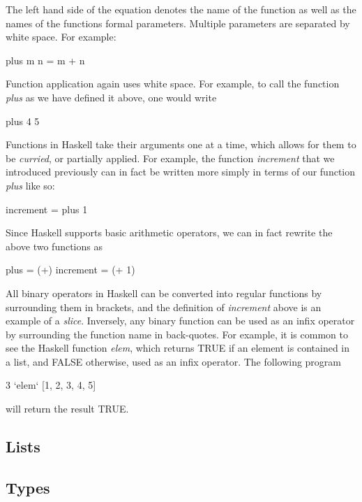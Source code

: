 \documentclass[thesis.tex]{subfiles}
\begin{document}
The left hand side of the equation denotes the name of the function as well as the names of the
functions formal parameters. Multiple parameters are separated by white space. For example:

\begin{spec}
plus m n = m + n
\end{spec}

Function application again uses white space. For example, to call the function \emph{plus} as we have
defined it above, one would write

\begin{spec}
plus 4 5
\end{spec}

Functions in Haskell take their arguments one at a time, which allows for them to be \emph{curried}, or
partially applied. For example, the function \emph{increment} that we introduced previously can in fact
be written more simply in terms of our function \emph{plus} like so:

\begin{spec}
increment = plus 1
\end{spec}

Since Haskell supports basic arithmetic operators, we can in fact rewrite the above two functions as

\begin{spec}
plus = (+)
increment = (+ 1)
\end{spec}

All binary operators in Haskell can be converted into regular functions by surrounding them in brackets,
and the definition of \emph{increment} above is an example of a \emph{slice}. Inversely, any binary function
can be used as an infix operator by surrounding the function name in back-quotes. For example, it is
common to see the Haskell function \emph{elem}, which returns TRUE if an element is contained in a list, and
FALSE otherwise, used as an infix operator. The following program

\begin{spec}
3 `elem` [1, 2, 3, 4, 5]
\end{spec}

will return the result TRUE.

\subsection{Lists}


\subsection{Types}
\end{document}
